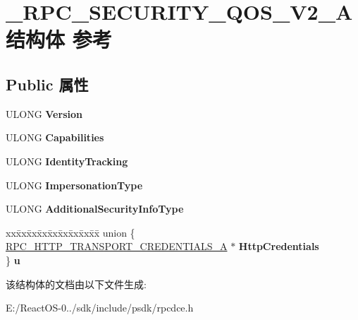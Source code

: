 \hypertarget{struct___r_p_c___s_e_c_u_r_i_t_y___q_o_s___v2___a}{}\section{\+\_\+\+R\+P\+C\+\_\+\+S\+E\+C\+U\+R\+I\+T\+Y\+\_\+\+Q\+O\+S\+\_\+\+V2\+\_\+\+A结构体 参考}
\label{struct___r_p_c___s_e_c_u_r_i_t_y___q_o_s___v2___a}
\subsection*{Public 属性}
\begin{DoxyCompactItemize}
\item 
\mbox{\label{struct___r_p_c___s_e_c_u_r_i_t_y___q_o_s___v2___a_a1d6676d6ff7ec79b23381fed0363709f}} 
U\+L\+O\+NG {\bfseries Version}
\item 
\mbox{\label{struct___r_p_c___s_e_c_u_r_i_t_y___q_o_s___v2___a_a317363a7a9623ea232fa876b835170bf}} 
U\+L\+O\+NG {\bfseries Capabilities}
\item 
\mbox{\label{struct___r_p_c___s_e_c_u_r_i_t_y___q_o_s___v2___a_a17628787a9093ee2778613e28cec01d1}} 
U\+L\+O\+NG {\bfseries Identity\+Tracking}
\item 
\mbox{\label{struct___r_p_c___s_e_c_u_r_i_t_y___q_o_s___v2___a_a06633fc07d25d49291be58d9e61a4483}} 
U\+L\+O\+NG {\bfseries Impersonation\+Type}
\item 
\mbox{\label{struct___r_p_c___s_e_c_u_r_i_t_y___q_o_s___v2___a_a25c175f51a7e8298afe4be163ddc482c}} 
U\+L\+O\+NG {\bfseries Additional\+Security\+Info\+Type}
\item 
\mbox{\label{struct___r_p_c___s_e_c_u_r_i_t_y___q_o_s___v2___a_a685e1ea577b1f1d8d3a51152eae20ca1}} 
\begin{tabbing}
xx\=xx\=xx\=xx\=xx\=xx\=xx\=xx\=xx\=\kill
union \{\\
\>\hyperlink{struct___r_p_c___h_t_t_p___t_r_a_n_s_p_o_r_t___c_r_e_d_e_n_t_i_a_l_s___a}{RPC\_HTTP\_TRANSPORT\_CREDENTIALS\_A} $\ast$ {\bfseries HttpCredentials}\\
\} {\bfseries u}\\

\end{tabbing}\end{DoxyCompactItemize}


该结构体的文档由以下文件生成\+:\begin{DoxyCompactItemize}
\item 
E\+:/\+React\+O\+S-\/0../sdk/include/psdk/rpcdce.\+h\end{DoxyCompactItemize}
